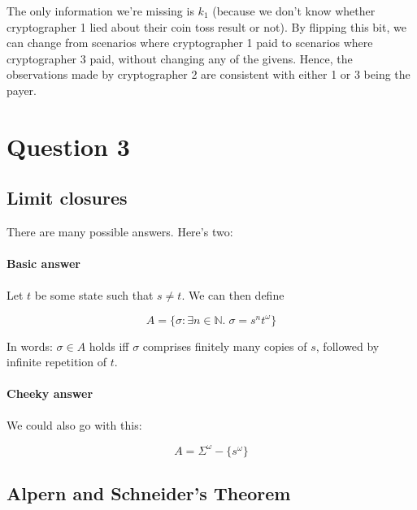 \documentclass{article}
\begin{document}
The only information we're missing is $k_1$ (because we don't know whether
cryptographer 1 lied about their coin toss result or not).
By flipping this bit, we can change from scenarios where cryptographer 1
paid to scenarios where cryptographer 3 paid, without changing any of
the givens.
Hence, the observations made by cryptographer 2 are consistent with either
1 or 3 being the payer.

\section{Question 3}

\subsection{Limit closures}

There are many possible answers. Here's two:

\paragraph{Basic answer}
Let $t$ be some state such that $s \neq t$.
We can then define

\[A = \{\sigma : \exists n\in\mathbb{N}.\;\sigma = s^nt^\omega\}\]

In words: $\sigma \in A$ holds iff $\sigma$ comprises
finitely many copies of $s$, followed by infinite repetition of $t$.

\paragraph{Cheeky answer}
We could also go with this:

\[A = \Sigma^\omega - \{s^\omega\}\]

\subsection{Alpern and Schneider's Theorem}
\end{document}
